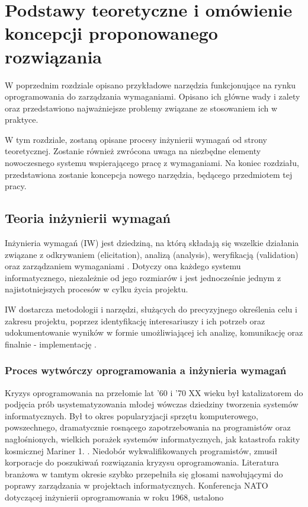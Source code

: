 \chapter{Podstawy teoretyczne i omówienie koncepcji proponowanego rozwiązania}
  
  W poprzednim rozdziale opisano przykładowe narzędzia funkcjonujące na rynku oprogramowania do zarządzania wymaganiami. Opisano ich główne wady i zalety oraz przedstawiono najważniejsze problemy związane ze stosowaniem ich w praktyce.

  W tym rozdziale, zostaną opisane procesy inżynierii wymagań od strony teoretycznej. Zostanie również zwrócona uwaga na niezbędne elementy nowoczesnego systemu wspierającego pracę z wymaganiami. Na koniec rozdziału, przedstawiona zostanie koncepcja nowego narzędzia, będącego przedmiotem tej pracy.
  
  \section{Teoria inżynierii wymagań}
    
    Inżynieria wymagań (IW) jest dziedziną, na którą składają się wszelkie działania związane z odkrywaniem (elicitation), analizą (analysis), weryfikacją (validation) oraz zarządzaniem wymaganiami \cite{Somm06}. Dotyczy ona każdego systemu informatycznego, niezależnie od jego rozmiarów i jest jednocześnie jednym z najistotniejszych procesów w cylku życia projektu.

    IW dostarcza metodologii i narzędzi, służących do precyzyjnego określenia celu i zakresu projektu, poprzez identyfikację interesariuszy i ich potrzeb oraz udokumentowanie wyników w formie umożliwiającej ich analizę, komunikację oraz finalnie - implementację \cite{Nus00}. 

    \subsection{Proces wytwórczy oprogramowania a inżynieria wymagań}

      Kryzys oprogramowania na przełomie lat '60 i '70 XX wieku był katalizatorem do podjęcia prób usystematyzowania młodej wówczas dziedziny tworzenia systemów informatycznych. Był to okres popularyzjacji sprzętu komputerowego, powszechnego, dramatycznie rosnącego zapotrzebowania na programistów oraz nagłośnionych, wielkich porażek systemów informatycznych, jak katastrofa rakity kosmicznej Mariner 1. \cite{Brooks75}. Niedobór wykwalifikowanych programistów, zmusił korporacje do poszukiwań rozwiązania kryzysu oprogramowania. Literatura branżowa w tamtym okresie szybko przepełniła się głosami nawołującymi do poprawy zarządzania w projektach informatycznych. 
      Konferencja NATO dotyczącej inżynierii oprogramowania w roku 1968, ustalono 

